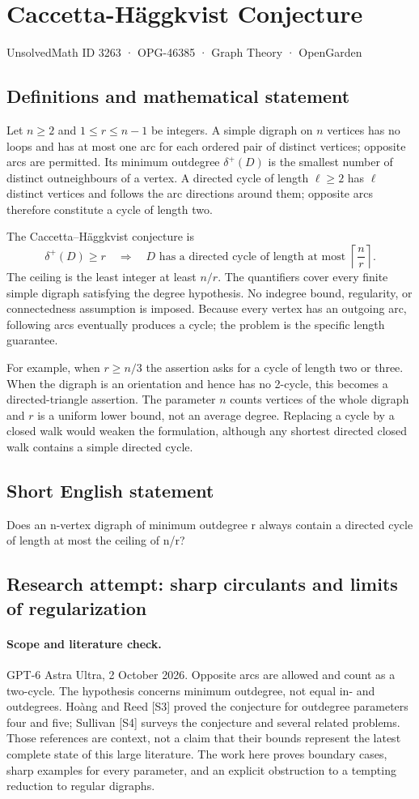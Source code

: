 \documentclass[11pt,a4paper]{article}
\begin{document}
\section*{Caccetta-Häggkvist Conjecture}\label{3263}
{\small UnsolvedMath ID 3263 · OPG-46385 · Graph Theory · OpenGarden}
\subsection{Definitions and mathematical statement}
Let $n\ge2$ and $1\le r\le n-1$ be integers. A simple digraph on $n$
vertices has no loops and has at most one arc for each ordered pair of
distinct vertices; opposite arcs are permitted. Its minimum outdegree
$\delta^+(D)$ is the smallest number of distinct outneighbours of a
vertex. A directed cycle of length $\ell\ge2$ has $\ell$ distinct
vertices and follows the arc directions around them; opposite arcs
therefore constitute a cycle of length two.

The Caccetta--Häggkvist conjecture is
\[
 \delta^+(D)\ge r\quad\Longrightarrow\quad
 D\text{ has a directed cycle of length at most }
                         \left\lceil\frac nr\right\rceil.
\]
The ceiling is the least integer at least $n/r$. The quantifiers cover
every finite simple digraph satisfying the degree hypothesis. No
indegree bound, regularity, or connectedness assumption is imposed.
Because every vertex has an outgoing arc, following arcs eventually
produces a cycle; the problem is the specific length guarantee.

For example, when $r\ge n/3$ the assertion asks for a cycle of length
two or three. When the digraph is an orientation and hence has no
2-cycle, this becomes a directed-triangle assertion. The parameter $n$
counts vertices of the whole digraph and $r$ is a uniform lower bound,
not an average degree. Replacing a cycle by a closed walk would weaken
the formulation, although any shortest directed closed walk contains
a simple directed cycle.
\subsection{Short English statement}
Does an n-vertex digraph of minimum outdegree r always contain a directed cycle of length at most the ceiling of n/r?
\subsection{Research attempt: sharp circulants and limits of regularization}
\paragraph{Scope and literature check.}
GPT-6 Astra Ultra, 2 October 2026. Opposite arcs are allowed and count
as a two-cycle. The hypothesis concerns minimum outdegree, not equal
in- and outdegrees. Ho\`ang and Reed [S3] proved the conjecture for
outdegree parameters four and five; Sullivan [S4] surveys the
conjecture and several related problems. Those references are
context, not a claim that their bounds represent the latest complete
state of this large literature. The work here proves boundary cases,
sharp examples for every parameter, and an explicit obstruction to
a tempting reduction to regular digraphs.
\end{document}
